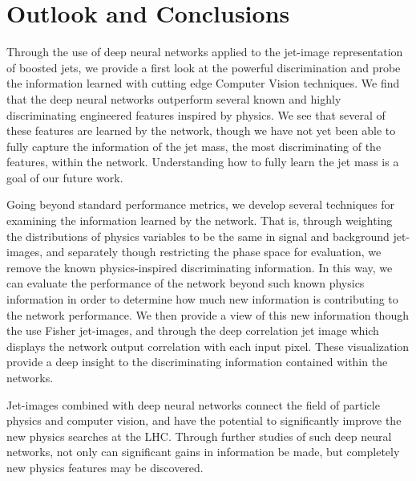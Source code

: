 \section{Outlook and Conclusions}
\label{sec:conclusion}
Through the use of deep neural networks applied to the jet-image representation of boosted jets, we provide a first look at the powerful discrimination and probe the information learned with cutting edge Computer Vision techniques.  We find that the deep neural networks outperform several known and highly discriminating engineered features inspired by physics.  We see that several of these features are learned by the network, though we have not yet been able to fully capture the information of the jet mass, the most discriminating of the features, within the network.  Understanding how to fully learn the jet mass is a goal of our future work.

Going beyond standard performance metrics, we develop several techniques for examining the information learned by the network.  That is, through weighting the distributions of physics variables to be the same in signal and background jet-images, and separately though restricting the phase space for evaluation, we remove the known physics-inspired discriminating information.  In this way, we can evaluate the performance of the network beyond such known physics information in order to determine how much new information is contributing to the network performance.  We then provide a view of  this new information though the use Fisher jet-images, and through the deep correlation jet image which displays the network output correlation with each input pixel.  These visualization provide a deep insight to the discriminating information contained within the networks.

Jet-images combined with deep neural networks connect the field of particle physics and computer vision, and have the potential to significantly improve the new physics searches at the LHC.  Through further studies of such deep neural networks, not only can significant gains in information be made, but completely new physics features may be discovered.